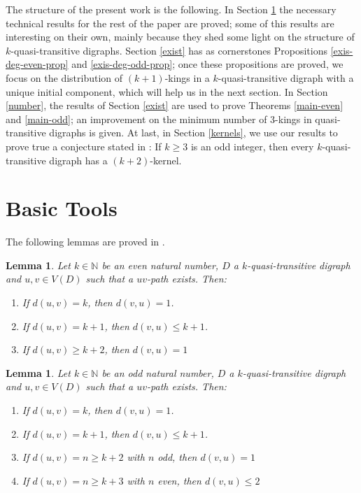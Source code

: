 \documentclass[preprint]{elsarticle}
\newtheorem{lem}[thm]{Lemma}
\begin{document}
The structure of the present work is the following.   In Section \ref{Tools} the necessary technical results for the rest of the paper are proved; some of this results are interesting on their own, mainly because they shed some light on the structure of $k$-quasi-transitive digraphs.   Section \ref{exist} has as cornerstones Propositions \ref{exis-deg-even-prop} and \ref{exis-deg-odd-prop}; once these propositions are proved, we focus on the distribution of $(k+1)$-kings in a $k$-quasi-transitive digraph with a unique initial component, which will help us in the next section.   In Section \ref{number}, the results of Section \ref{exist} are used to prove Theorems \ref{main-even} and \ref{main-odd}; an improvement on the minimum number of $3$-kings in quasi-transitive digraphs is given.   At last, in Section \ref{kernels}, we use our results to prove true a conjecture stated in \cite{GS-HC}: If $k \ge 3 $ is an odd integer, then every $k$-quasi-transitive digraph has a $(k+2)$-kernel.






















\section{Basic Tools} \label{Tools}

The following lemmas are proved in \cite{GS-HC}.

\begin{lem} \label{q-edist}
Let $k \in \mathbb{N}$ be an even natural number, $D$ a $k$-quasi-transitive digraph and $u,v \in V(D)$ such that a $uv$-path exists.   Then:
	\begin{enumerate}
		\item If $d(u,v)=k$, then $d(v,u)=1$.
		\item If $d(u,v)=k+1$, then $d(v,u) \le k+1$.
		\item If $d(u,v) \ge k+2$, then $d(v,u)=1$
	\end{enumerate}
\end{lem}


\begin{lem} \label{q-odist}
Let $k \in \mathbb{N}$ be an odd natural number, $D$ a $k$-quasi-transitive digraph and $u,v \in V(D)$ such that a $uv$-path exists.   Then:
	\begin{enumerate}
		\item If $d(u,v)=k$, then $d(v,u)=1$.
		\item If $d(u,v)=k+1$, then $d(v,u) \le k+1$.
		\item If $d(u,v)=n \ge k+2$ with $n$ odd, then $d(v,u)=1$
		\item If $d(u,v)=n \ge k+3$ with $n$ even, then $d(v,u) \le 2$
	\end{enumerate}
\end{lem}
\end{document}
